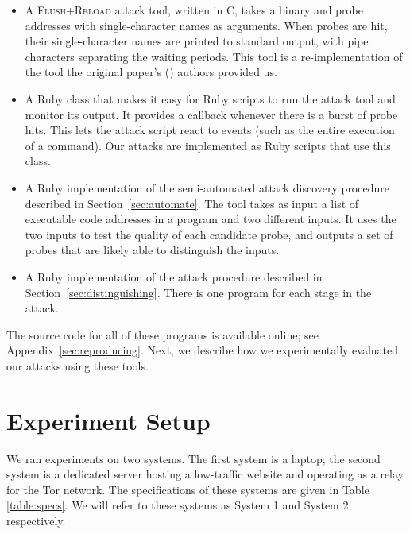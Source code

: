 \documentclass[letterpaper,twocolumn,10pt]{article}
\begin{document}
\begin{itemize}
    \item A \textsc{Flush+Reload} attack tool, written in C, takes a binary and probe
        addresses with single-character names as arguments. When probes are hit,
        their single-character names are printed to standard output, with pipe
        characters separating the waiting periods. This tool is
        a re-implementation of the tool the original paper's
        (\cite{yarom2013flush}) authors provided us.

    \item A Ruby class that makes it easy for Ruby scripts to run the attack
        tool and monitor its output. It provides a callback whenever there is
        a burst of probe hits. This lets the attack script react to events (such
        as the entire execution of a command). Our attacks are implemented as
        Ruby scripts that use this class.

    \item A Ruby implementation of the semi-automated attack discovery procedure
        described in Section~\ref{sec:automate}. The tool takes as input a list
        of executable code addresses in a program and two different inputs. It
        uses the two inputs to test the quality of each candidate probe, and
        outputs a set of probes that are likely able to distinguish the inputs.

    \item A Ruby implementation of the attack procedure described in
          Section~\ref{sec:distinguishing}. There is one program for each stage
          in the attack.
\end{itemize}

The source code for all of these programs is available online; see
Appendix~\ref{sec:reproducing}. Next, we describe how we experimentally
evaluated our attacks using these tools.

\section{Experiment Setup}
\label{sec:experimentsetup}

We ran experiments on two systems. The first system is a laptop; the second
system is a dedicated server hosting a low-traffic website and operating as
a relay for the Tor network. The specifications of these systems are given in
Table \ref{table:specs}. We will refer to these systems as System 1 and System
2, respectively.
\end{document}
